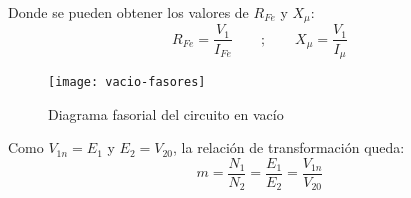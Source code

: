 Donde se pueden obtener los valores de $R_{Fe}$ y $X_{\mu}$:
\begin{equation*}
	R_{Fe}=\dfrac{V_{1}}{I_{Fe}}\qquad;\qquad X_{\mu}=\dfrac{V_{1}}{I_{\mu}}
\end{equation*}
\begin{figure}[H]
	\centering
	\texttt{[image: vacio-fasores]}
	\caption{Diagrama fasorial del circuito en vacío}
	\label{fig:vacio-fasores}
\end{figure}
Como $V_{1n}=E_{1}$ y $E_{2}=V_{20}$, la relación de transformación queda:
\begin{equation*}
	m=\dfrac{N_{1}}{N_{2}}=\dfrac{E_{1}}{E_{2}}=\dfrac{V_{1n}}{V_{20}}
\end{equation*}